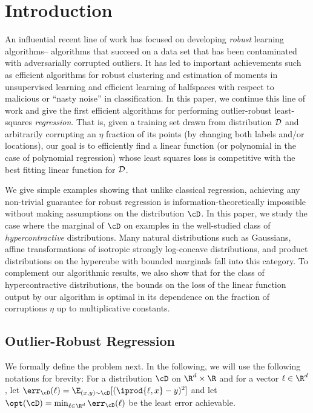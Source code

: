 \section{Introduction}

An influential recent line of work has focused on developing {\em robust} learning algorithms--
algorithms that succeed on a data set that has been
contaminated with adversarially corrupted outliers. It has led to important
achievements such as efficient algorithms for robust clustering and estimation of moments \citep{DBLP:journals/corr/LaiRV16,DBLP:journals/corr/DiakonikolasKKL16,DBLP:conf/stoc/CharikarSV17,DBLP:journals/corr/abs-1711-11581,DBLP:journals/corr/abs-1711-07465} in unsupervised learning and efficient learning of halfspaces \citep{DBLP:journals/jmlr/KlivansLS09,DBLP:journals/corr/DiakonikolasKS17} with respect to
malicious or ``nasty noise'' in classification.  In this paper, we continue this line of work and give the first
efficient algorithms for performing outlier-robust least-squares {\em regression}.  That is,
given a training set drawn from distribution ${\cal D}$ and arbitrarily corrupting an $\eta$
fraction of its points (by changing both labels and/or locations), our goal is to efficiently find a linear function (or polynomial in
the case of polynomial regression) whose least squares loss is competitive with the
best fitting linear function for ${\cal D}$.

We give simple examples showing that unlike classical regression, achieving any non-trivial guarantee for robust regression is information-theoretically impossible without making assumptions on the distribution $\cD$. In this paper, we study the case where the marginal of $\cD$ on examples in the well-studied class of \emph{hypercontractive} distributions. Many natural distributions such as Gaussians, affine transformations of isotropic strongly log-concave distributions, and product distributions on the hypercube with bounded marginals fall into this category. To complement our algorithmic results, we also show that for the class of hypercontractive distributions, the bounds on the loss of the linear function output by our algorithm is optimal in its dependence on the fraction of corruptions $\eta$ up to multiplicative constants.

\subsection{Outlier-Robust Regression}
We formally define the problem next. In the following, we will use the following notations for brevity: For a distribution $\cD$ on $\R^d \times \R$ and for a vector $\ell \in \R^d$, let $\err_\cD(\ell) = \E_{(x,y) \sim \cD}[ (\iprod{\ell,x} - y)^2]$ and let $\opt(\cD) = \min_{\ell \in \R^d} \err_{\cD}(\ell)$ be the least error achievable. 

